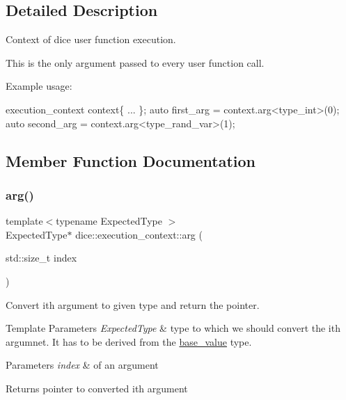 \subsection{Detailed Description}
Context of dice user function execution. 

This is the only argument passed to every user function call.

Example usage\+: 
\begin{DoxyCode}
execution\_context context\{ ... \};
\textcolor{keyword}{auto} first\_arg = context.arg<type\_int>(0);
\textcolor{keyword}{auto} second\_arg = context.arg<type\_rand\_var>(1);
\end{DoxyCode}
 

\subsection{Member Function Documentation}
\mbox{\label{classdice_1_1execution__context_a58d8a206afcc569dd4ac813a3002ac77}} 
\subsubsection{\texorpdfstring{arg()}{arg()}}
{\footnotesize\ttfamily template$<$typename Expected\+Type $>$ \\
Expected\+Type$\ast$ dice\+::execution\+\_\+context\+::arg (\begin{DoxyParamCaption}\item[{std\+::size\+\_\+t}]{index }\end{DoxyParamCaption})\hspace{0.3cm}{\ttfamily [inline]}}



Convert ith argument to given type and return the pointer. 


\begin{DoxyTemplParams}{Template Parameters}
{\em Expected\+Type} & type to which we should convert the ith argumnet. It has to be derived from the \mbox{\hyperlink{classdice_1_1base__value}{base\+\_\+value}} type.\\
\hline
\end{DoxyTemplParams}

\begin{DoxyParams}{Parameters}
{\em index} & of an argument\\
\hline
\end{DoxyParams}
\begin{DoxyReturn}{Returns}
pointer to converted ith argument
\end{DoxyReturn}


